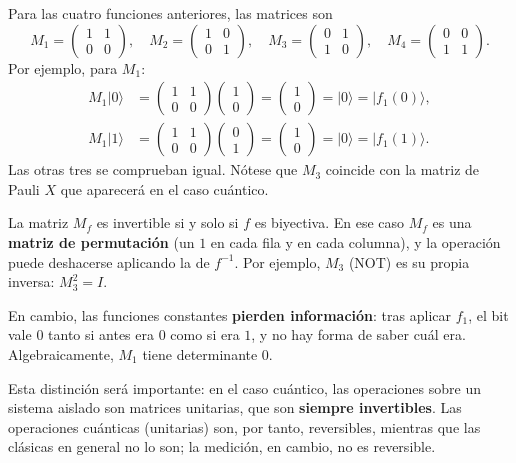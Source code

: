 \documentclass[11pt, a4paper, twoside, openright]{report}
\begin{document}
\noindent Para las cuatro funciones anteriores, las matrices son
\[
M_1 = \begin{pmatrix} 1 & 1 \\ 0 & 0 \end{pmatrix}, \quad
M_2 = \begin{pmatrix} 1 & 0 \\ 0 & 1 \end{pmatrix}, \quad
M_3 = \begin{pmatrix} 0 & 1 \\ 1 & 0 \end{pmatrix}, \quad
M_4 = \begin{pmatrix} 0 & 0 \\ 1 & 1 \end{pmatrix}.
\]
Por ejemplo, para $M_1$:
\begin{align*}
M_1|0\rangle &= \begin{pmatrix} 1 & 1 \\ 0 & 0 \end{pmatrix}\begin{pmatrix} 1 \\ 0 \end{pmatrix} = \begin{pmatrix} 1 \\ 0 \end{pmatrix} = |0\rangle = |f_1(0)\rangle, \\
M_1|1\rangle &= \begin{pmatrix} 1 & 1 \\ 0 & 0 \end{pmatrix}\begin{pmatrix} 0 \\ 1 \end{pmatrix} = \begin{pmatrix} 1 \\ 0 \end{pmatrix} = |0\rangle = |f_1(1)\rangle.
\end{align*}
Las otras tres se comprueban igual. Nótese que $M_3$ coincide con la matriz de Pauli $X$ que aparecerá en el caso cuántico.

\begin{tcolorbox}[colback=blue!5!white,colframe=blue!75!black,title=\textbf{Nota Aclaratoria: Operaciones que pierden información}]
La matriz $M_f$ es invertible si y solo si $f$ es biyectiva. En ese caso $M_f$ es una \textbf{matriz de permutación} (un $1$ en cada fila y en cada columna), y la operación puede deshacerse aplicando la de $f^{-1}$. Por ejemplo, $M_3$ (NOT) es su propia inversa: $M_3^2 = I$.

En cambio, las funciones constantes \textbf{pierden información}: tras aplicar $f_1$, el bit vale $0$ tanto si antes era $0$ como si era $1$, y no hay forma de saber cuál era. Algebraicamente, $M_1$ tiene determinante $0$.

Esta distinción será importante: en el caso cuántico, las operaciones sobre un sistema aislado son matrices unitarias, que son \textbf{siempre invertibles}. Las operaciones cuánticas (unitarias) son, por tanto, reversibles, mientras que las clásicas en general no lo son; la medición, en cambio, no es reversible.
\end{tcolorbox}
\end{document}
